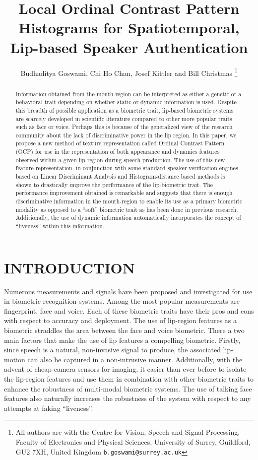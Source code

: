 \documentclass[a4paper, 10pt, conference]{ieeeconf}      %
\title{\LARGE \bf
Local Ordinal Contrast Pattern Histograms for Spatiotemporal, Lip-based Speaker Authentication}
\author{Budhaditya Goswami, Chi Ho Chan, Josef Kittler and Bill Christmas%
\thanks{All authors are with the Centre for Vision, Speech and Signal Processing, Faculty of Electronics and Physical Sciences, University of Surrey, Guildford, GU2 7XH, United Kingdom {\tt\small b.goswami@surrey.ac.uk}}%
}
\begin{document}
\maketitle
\thispagestyle{empty}
\pagestyle{empty}


\begin{abstract}

Information obtained from the mouth-region can be interpreted as either a genetic or a behavioral trait depending on whether static or dynamic information is used. Despite this breadth of possible application as a biometric trait, lip-based biometric systems are scarcely developed in scientific literature compared to other more popular traits such as face or voice. Perhaps this is because of the generalized view of the research community about the lack of discriminative power in the lip region. In this paper, we propose a new method of texture representation called Ordinal Contrast Pattern (OCP) for use in the representation of both appearance and dynamics features observed within a given lip region during speech production. The use of this new feature representation, in conjunction with some standard speaker verification engines based on Linear Discriminant Analysis and Histogram-distance based methods is shown to drastically improve the performance of the lip-biometric trait. The performance improvement obtained is remarkable and suggests that there is enough discriminative information in the mouth-region to enable its use as a primary biometric modality as opposed to a ``soft'' biometric trait as has been done in previous research. Additionally, the use of dynamic information automatically incorporates the concept of ``liveness'' within this information.
\end{abstract}


\section{INTRODUCTION}

Numerous measurements and signals have been proposed and investigated for use in biometric recognition systems. Among the most popular measurements are fingerprint, face and voice. Each of these biometric traits have their pros and cons with respect to accuracy and deployment. The use of lip-region features as a biometric straddles the area between the face and voice biometric. There a two main factors that make the use of lip features a compelling biometric. Firstly, since speech is a natural, non-invasive signal to produce, the associated lip-motion can also be captured in a non-intrusive manner. Additionally, with the advent of cheap camera sensors for imaging, it easier than ever before to isolate the lip-region features and use them in combination with other biometric traits to enhance the robustness of multi-modal biometric systems. The use of talking face features also naturally increases the robustness of the system with respect to any attempts at faking ``liveness''.
 
\end{document}
